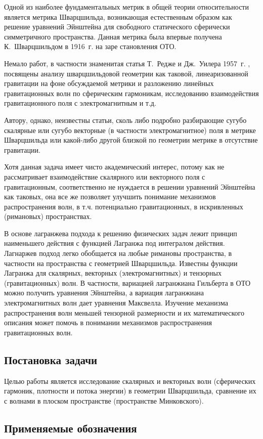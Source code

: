 \documentclass[\docroot/reports/draft/report.tex]{subfiles}
\begin{document}
\onlyinsubfile{\tableofcontents}

Одной из наиболее фундаментальных метрик в общей теории относительности является метрика Шварцшильда, возникающая естественным образом как решение уравнений Эйнштейна для свободного статического сферически симметричного пространства. Данная метрика была впервые получена К.~Шварцшильдом в 1916~г. \cite{schwarzschild_free_space_rus} на заре становления ОТО.

Немало работ, в частности знаменитая статья Т.~Редже и Дж.~Уилера 1957~г. \cite{regge_wheeler_1957}, посвящены анализу шварцшильдовой геометрии как таковой, линеаризованной гравитации на фоне обсуждаемой метрики и разложению линейных гравитационных волн по сферическим гармоникам, исследованию взаимодействия гравитационного поля с электромагнитным и т.д.

Автору, однако, неизвестны статьи, сколь либо подробно разбирающие сугубо скалярные или сугубо векторные (в частности электромагнитное) поля в метрике Шварцшильда или какой-либо другой близкой по геометрии метрике в отсутствие гравитации.

Хотя данная задача имеет чисто академический интерес, потому как не рассматривает взаимодействие скалярного или векторного поля с гравитационным, соответственно не нуждается в решении уравнений Эйнштейна как таковых, она все же позволяет улучшить понимание механизмов распространения волн, в т.ч. потенциально гравитационных, в искривленных (римановых) пространствах.

В основе лагранжева подхода к решению физических задач лежит принцип наименьшего действия с функцией Лагранжа под интегралом действия. Лагнаржев подход легко обобщается на любые римановы пространства, в частности на пространства с геометрией Шварцшильда. Известны функции Лагранжа для скалярных, векторных (электромагнитных) и тензорных (гравитационных) волн. В частности, вариацией лагранжиана Гильберта в ОТО можно получить уравнения Эйнштейна, а вариация лагранжиана электромагнитных волн дает уравнения Максвелла. Изучение механизма распространения волн меньшей тензорной размерности и их математического описания может помочь в понимании механизмов распространения гравитационных волн.

\subsection{Постановка задачи}

Целью работы является исследование скалярных и векторных волн (сферических гармоник, плотности и потока энергии) в геометрии Шварцшильда, сравнение их с волнами в плоском пространстве (пространстве Минковского).

\subsection{Применяемые обозначения}\label{seq:notation}


\end{document}
